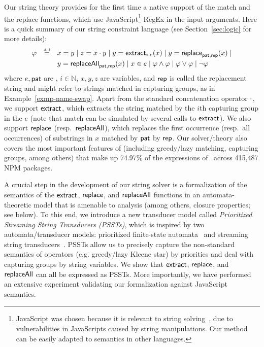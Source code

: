 Our string theory provides for the first time a native support of the match and the
replace functions, which use JavaScript\footnote{JavaScript was chosen
because it is relevant to string solving~\cite{BEK,Berkeley-JavaScript}, due to vulnerabilities in JavaScripts
caused by string manipulations. Our method can be easily adapted to \regexp{}
semantics in other languages.} RegEx in the input arguments. Here is a quick
summary of our string constraint language (see Section~\ref{sec:logic} for
more details):
\[
\begin{array}{l c l}
\smallskip
\varphi & \eqdef  & x = y \mid z = x \concat y \mid y  = \extract_{i, e}(x) \mid
y  = \replace_{\pat, \rep}(x) \mid
\\
& & y = \replaceall_{\pat, \rep}(x)   \mid
 x \in e \mid \varphi \wedge \varphi \mid \varphi \vee \varphi \mid \neg \varphi \
\label{eq:SL-intro}
\end{array}
\]
where $e, \mathsf{pat}$ are \regexps, $i \in \mathbb{N}$, $x,y,z$ are variables, and $\mathsf{rep}$
is called the
replacement string and might refer to strings matched in capturing groups,
as in Example~\ref{exmp-name-swap}. Apart from the standard concatenation
operator $\cdot$, we support $\mathsf{extract}$, which extracts the string matched by
the $i$th capturing group in the \regexp{} $e$ (note that match can be simulated
by several calls to $\mathsf{extract}$). We also support $\mathsf{replace}$
(resp.~$\mathsf{replaceAll}$), which replaces the first occurrence (resp.~all
occurrences) of substrings in $x$ matched by $\mathsf{pat}$ by $\mathsf{rep}$. Our solver/theory
also covers the most important features of \regexp{} (including greedy/lazy
matching, capturing groups, among others) that make up 74.97\% of the \regexp{}
expressions of~\cite{LMK19} across 415,487 NPM packages.

A crucial step in the development of our string solver is a formalization of
the semantics of the $\mathsf{extract}$, $\mathsf{replace}$, and $\mathsf{replaceAll}$ functions in
an automata-theoretic model that is amenable to analysis (among others, closure
properties; see below).
%
To this end, we introduce a new
transducer model called \emph{Prioritized Streaming String Transducers (PSSTs)},
which is inspired by %
two automata/transducer models: prioritized finite-state automata~\cite{BM17}
and streaming string transducers~\cite{AC10,AD11}. PSSTs allow us to precisely
capture the non-standard semantics of \regexp{} operators (e.g. greedy/lazy Kleene star) by priorities and
deal with capturing groups by string variables.
We show that $\mathsf{extract}$, $\mathsf{replace}$, and $\mathsf{replaceAll}$ can all be expressed as
PSSTs. More importantly, we have performed an extensive experiment
validating our formalization against JavaScript semantics.

